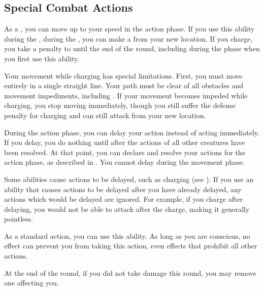     \subsection{Special Combat Actions}

        \label{Charge} As a , you can move up to your speed in the action phase.
        If you use this ability during the , during the , you can make a  from your new location.
        If you charge, you take a  penalty to  until the end of the round, including during the phase when you first use this ability.

        \par Your movement while charging has special limitations.
        First, you must move entirely in a single straight line.
        Your path must be clear of all obstacles and movement impediments, including .
        If your movement becomes impeded while charging, you stop moving immediately, though you still suffer the defense penalty for charging and can still attack from your new location.

        \label{Delay}
        During the action phase, you can delay your action instead of acting immediately.
        If you delay, you do nothing until after the actions of all other creatures have been resolved.
        At that point, you can declare and resolve your actions for the action phase, as described in .
        You cannot delay during the movement phase.

        Some abilities cause actions to be delayed, such as charging (see ).
        If you use an ability that causes actions to be delayed after you have already delayed, any actions which would be delayed are ignored.
        For example, if you charge after delaying, you would not be able to attack after the charge, making it generally pointless.

        \label{Desperate Recovery}
        As a standard action, you can use this ability.
        As long as you are conscious, no effect can prevent you from taking this action, even effects that prohibit all other actions.
        \begin{ability}
            \begin{spelleffects}
                \spelleffect At the end of the round, if you did not take damage this round, you may remove one  affecting you.
            \end{spelleffects}
        \end{ability}

